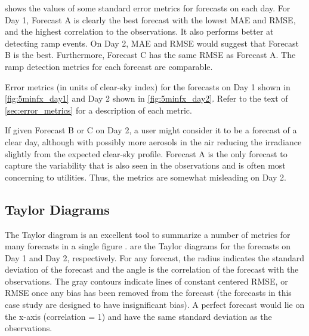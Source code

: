  shows the values of some standard error metrics
for forecasts on each day.
For Day 1, Forecast A is clearly the best forecast with the lowest
MAE and RMSE, and the highest correlation to the observations.
It also performs better at detecting ramp events.
On Day 2, MAE and RMSE would suggest that Forecast B is the best.
Furthermore, Forecast C has the same RMSE as Forecast A.
The ramp detection metrics for each forecast are comparable.

\begin{table}[tbp]
\centering
\caption[Error metrics for contrived test forecasts]{Error metrics (in units
of clear-sky index) for the forecasts on Day 1 shown in
\cref{fig:5minfx_day1} and Day 2 shown in
\cref{fig:5minfx_day2}. Refer to the text of \cref{sec:error_metrics}
for a description of each metric.}
\label{table:fx_errs}
\vspace{.3em}
\captionsetup{position=top}
\hspace{3em}
\end{table}

If given Forecast B or C on Day 2, a user might consider it to be a
forecast of a clear day, although with possibly more aerosols in the
air reducing the irradiance slightly from the expected clear-sky
profile.
Forecast A is the only forecast to capture the variability that is
also seen in the observations and is often most concerning to
utilities.
Thus, the metrics are somewhat misleading on Day 2.

\subsection{Taylor Diagrams}
The Taylor diagram is an excellent tool to summarize a number of
metrics for many forecasts in a single figure \citep{Taylor2001}.
 are the Taylor diagrams for the
forecasts on Day 1 and Day 2, respectively.
For any forecast, the radius indicates the standard deviation of the
forecast and the angle is the correlation of the forecast with the
observations.
The gray contours indicate lines of constant centered RMSE, or RMSE
once any bias has been removed from the forecast (the forecasts in
this case study are designed to have insignificant bias).
A perfect forecast would lie on the x-axis (correlation = 1) and have
the same standard deviation as the observations.

